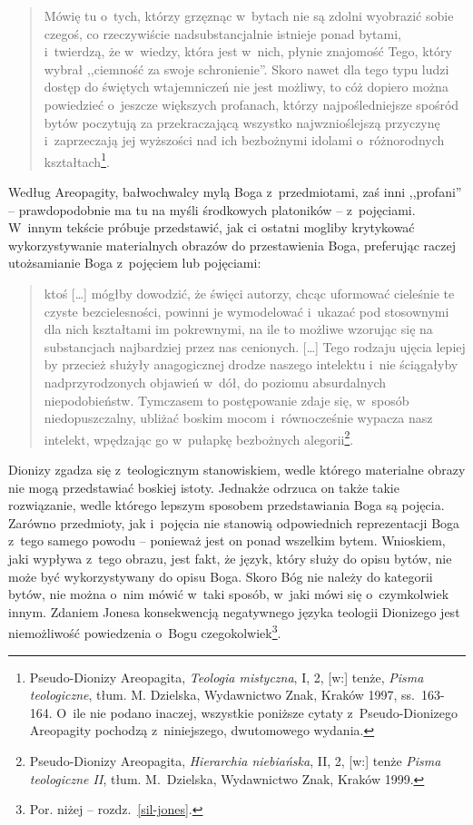 \begin{quote}
Mówię tu o~tych, którzy grzęznąc w~bytach nie są zdolni wyobrazić sobie czegoś, co rzeczywiście nadsubstancjalnie istnieje ponad bytami, i~twierdzą, że w~wiedzy, która jest w~nich, płynie znajomość Tego, który wybrał ,,ciemność za swoje schronienie''. Skoro nawet dla tego typu ludzi dostęp do świętych wtajemniczeń nie jest możliwy, to cóż dopiero można powiedzieć o~jeszcze większych profanach, którzy najpośledniejsze spośród bytów poczytują za przekraczającą wszystko najwznioślejszą przyczynę i~zaprzeczają jej wyższości nad ich bezbożnymi idolami o~różnorodnych kształtach\footnote{Pseudo-Dionizy Areopagita, \textit{Teologia mistyczna}, I, 2, [w:] tenże, \textit{Pisma teologiczne}, tłum. M. Dzielska, Wydawnictwo Znak, Kraków 1997, ss.~163-164. O~ile nie podano inaczej, wszystkie poniższe cytaty z~Pseudo-Dionizego Areopagity pochodzą z~niniejszego, dwutomowego wydania.}.
\end{quote}

Według Areopagity, bałwochwalcy mylą Boga z~przedmiotami, zaś inni ,,profani'' -- prawdopodobnie ma tu na myśli środkowych platoników -- z~pojęciami. W~innym tekście próbuje przedstawić, jak ci ostatni mogliby krytykować wykorzystywanie materialnych obrazów do przestawienia Boga, preferując raczej utożsamianie Boga z~pojęciem lub pojęciami:

\begin{quote}
ktoś [\ldots] mógłby dowodzić, że święci autorzy, chcąc uformować cieleśnie te czyste bezcielesności, powinni je wymodelować i~ukazać pod stosownymi dla nich kształtami im pokrewnymi, na ile to możliwe wzorując się na substancjach najbardziej przez nas cenionych. [\ldots] Tego rodzaju ujęcia lepiej by przecież służyły anagogicznej drodze naszego intelektu i~nie ściągałyby nadprzyrodzonych objawień w~dół, do poziomu absurdalnych niepodobieństw. Tymczasem to postępowanie zdaje się, w~sposób niedopuszczalny, ubliżać boskim mocom i~równocześnie wypacza nasz intelekt, wpędzając go w~pułapkę bezbożnych alegorii\footnote{Pseudo-Dionizy Areopagita, \textit{Hierarchia niebiańska}, II, 2, [w:] tenże  \textit{Pisma teologiczne II}, tłum. M.~Dzielska, Wydawnictwo Znak, Kraków 1999.}.
\end{quote}

Dionizy zgadza się z~teologicznym stanowiskiem, wedle którego materialne obrazy nie mogą przedstawiać boskiej istoty. Jednakże odrzuca on także takie rozwiązanie, wedle którego lepszym sposobem przedstawiania Boga są pojęcia. Zarówno przedmioty, jak i~pojęcia nie stanowią odpowiednich reprezentacji Boga z~tego samego powodu -- ponieważ jest on ponad wszelkim bytem. Wnioskiem, jaki wypływa z~tego obrazu, jest fakt, że język, który służy do opisu bytów, nie może być wykorzystywany do opisu Boga. Skoro Bóg nie należy do kategorii bytów, nie można o~nim mówić w~taki sposób, w~jaki mówi się o~czymkolwiek innym. Zdaniem Jonesa konsekwencją negatywnego języka teologii Dionizego jest niemożliwość powiedzenia o~Bogu czegokolwiek\footnote{Por. niżej -- rozdz.~\ref{sil-jones}.}.


